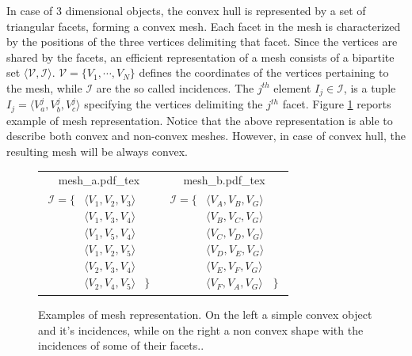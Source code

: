 \documentclass{article}
\begin{document}
In case of 3 dimensional objects, the convex hull is represented by a set of triangular facets, forming a convex mesh. Each facet in the mesh is characterized by the positions of the three vertices delimiting that facet. Since the vertices are shared by the facets,
an efficient representation of a mesh consists of a bipartite set $ \langle \mathcal{V} , \mathcal{I}  \rangle$. $\mathcal{V} =  \lbrace V_1, \cdots, V_N  \rbrace$ defines the coordinates of the vertices pertaining to the mesh, while $\mathcal{I}$ are the so called incidences. The $j^{th}$ element $I_j \in \mathcal{I}$, is a tuple $I_j  = \langle V^j_a, V^j_b, V^j_c \rangle$ specifying the vertices delimiting the $j^{th}$ facet.
Figure \ref{fig:mesh} reports example of mesh representation. Notice that the above representation is able to describe both convex and non-convex meshes. However, in case of convex hull, the resulting mesh will be always convex.


\begin{figure}
\begin{tabular}{cc}
\begin{minipage}[t]{0.35\textwidth}
\def\svgwidth{ \columnwidth}
{mesh_a.pdf_tex} 
\end{minipage} 
&
\begin{minipage}[t]{0.65\textwidth}
\def\svgwidth{ \columnwidth}
{mesh_b.pdf_tex} 
\end{minipage} 
\\ 
\begin{minipage}[t]{0.35\textwidth}
\begin{eqnarray}
\mathcal{I} = \lbrace & \langle V_1, V_2, V_3 \rangle & \nonumber\\
& \langle V_1, V_3, V_4 \rangle & \nonumber\\
& \langle V_1, V_5, V_4 \rangle & \nonumber\\
& \langle V_1, V_2, V_5 \rangle & \nonumber\\
& \langle V_2, V_3, V_4 \rangle & \nonumber\\
& \langle V_2, V_4, V_5 \rangle &
\rbrace
\end{eqnarray}
\end{minipage} 
&
\begin{minipage}[t]{0.65\textwidth}
\begin{eqnarray}
\mathcal{I} = \lbrace & \langle V_A, V_B, V_G \rangle & \nonumber\\
& \langle V_B, V_C, V_G \rangle & \nonumber\\
& \langle V_C, V_D, V_G \rangle & \nonumber\\
& \langle V_D, V_E, V_G \rangle & \nonumber\\
& \langle V_E, V_F, V_G \rangle & \nonumber\\
& \langle V_F, V_A, V_G \rangle & 
\rbrace
\end{eqnarray}
\end{minipage} 
\end{tabular}
\caption{Examples of mesh representation. On the left a simple convex object and it's incidences, while on the right a non convex shape with the incidences of some of their facets..}
\label{fig:mesh}
\end{figure} 
\end{document}
